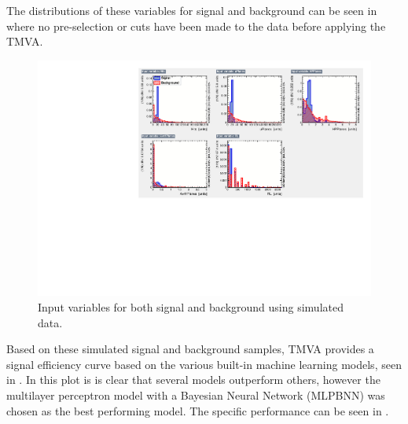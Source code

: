 The distributions of these variables for signal and background can be seen in  where no pre-selection or cuts have been made to the data before applying the TMVA.

\begin{figure}[h!]
\centering

\includegraphics[width=\textwidth]{figures/TMVA/inputvariables.pdf}
\caption{Input variables for both signal and background using simulated data.}
\label{fig:TMVAinput}
\end{figure}

Based on these simulated signal and background samples, TMVA provides a signal efficiency curve based on the various built-in machine learning models, seen in . In this plot is is clear that several models outperform others, however the multilayer perceptron model with a Bayesian Neural Network (MLPBNN) was chosen as the best performing model. The specific performance can be seen in .




